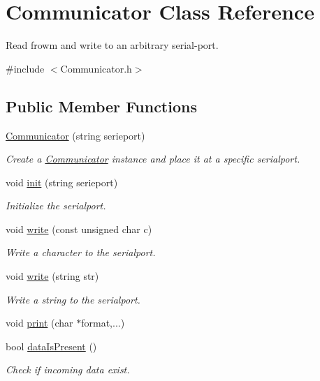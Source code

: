 \hypertarget{classCommunicator}{\section{Communicator Class Reference}
\label{classCommunicator}
}


Read frowm and write to an arbitrary serial-\/port.  




{\ttfamily \#include $<$Communicator.\-h$>$}

\subsection*{Public Member Functions}
\begin{DoxyCompactItemize}
\item 
\hyperlink{classCommunicator_a9376e2a4cfde05f3bcbae03523f47f09}{Communicator} (string serieport)
\begin{DoxyCompactList}\small\item\em Create a \hyperlink{classCommunicator}{Communicator} instance and place it at a specific serialport. \end{DoxyCompactList}\item 
void \hyperlink{classCommunicator_a99aabd49f9b816a256035130ed59d1c1}{init} (string serieport)
\begin{DoxyCompactList}\small\item\em Initialize the serialport. \end{DoxyCompactList}\item 
void \hyperlink{classCommunicator_a5a4b8c0d0d2a56c1e66b6baaa5dd0d9a}{write} (const unsigned char c)
\begin{DoxyCompactList}\small\item\em Write a character to the serialport. \end{DoxyCompactList}\item 
void \hyperlink{classCommunicator_aae6febfbbaadf6b7a53dd6718dc1fc26}{write} (string str)
\begin{DoxyCompactList}\small\item\em Write a string to the serialport. \end{DoxyCompactList}\item 
void \hyperlink{classCommunicator_a453c83fb4fcf3b6acf6e26269bbcb743}{print} (char $\ast$format,...)
\item 
bool \hyperlink{classCommunicator_ab8208da85e32d5802b6dcae11e5ddf3d}{data\-Is\-Present} ()
\begin{DoxyCompactList}\small\item\em Check if incoming data exist. \end{DoxyCompactList}\item 

\end{DoxyCompactItemize}
